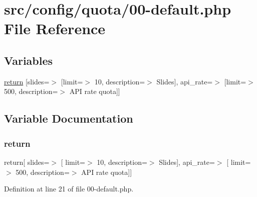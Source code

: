\hypertarget{quota_200-default_8php}{}\section{src/config/quota/00-\/default.php File Reference}
\label{quota_200-default_8php}
\subsection*{Variables}
\begin{DoxyCompactItemize}
\item 
\hyperlink{quota_200-default_8php_ae057f510746f2e7dcbd7d8ccfaf92a45}{return} \mbox{[}\textquotesingle{}slides\textquotesingle{}=$>$ \mbox{[}\textquotesingle{}limit\textquotesingle{}=$>$ 10, \textquotesingle{}description\textquotesingle{}=$>$ \textquotesingle{}Slides\textquotesingle{}\mbox{]}, \textquotesingle{}api\+\_\+rate\textquotesingle{}=$>$ \mbox{[}\textquotesingle{}limit\textquotesingle{}=$>$ 500, \textquotesingle{}description\textquotesingle{}=$>$ \textquotesingle{}A\+PI rate quota\textquotesingle{}\mbox{]}\mbox{]}
\end{DoxyCompactItemize}


\subsection{Variable Documentation}
\mbox{\label{quota_200-default_8php_ae057f510746f2e7dcbd7d8ccfaf92a45}} 
\subsubsection{\texorpdfstring{return}{return}}
{\footnotesize\ttfamily return\mbox{[} \textquotesingle{}slides\textquotesingle{}=$>$ \mbox{[} \textquotesingle{}limit\textquotesingle{}=$>$ 10, \textquotesingle{}description\textquotesingle{}=$>$ \textquotesingle{}Slides\textquotesingle{}\mbox{]}, \textquotesingle{}api\+\_\+rate\textquotesingle{}=$>$ \mbox{[} \textquotesingle{}limit\textquotesingle{}=$>$ 500, \textquotesingle{}description\textquotesingle{}=$>$ \textquotesingle{}A\+PI rate quota\textquotesingle{}\mbox{]}\mbox{]}}



Definition at line 21 of file 00-\/default.\+php.

